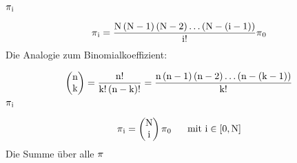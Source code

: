 {\begin{uebsp}
\begin{Answer}
$\normalsubformula{\text{$\pi
$}}_{\normalsubformula{\text{i}}}\normalsubformula{\text{~}}$

\begin{equation*}
\normalsubformula{\text{$\pi
$}}_{\normalsubformula{\text{i}}}=\frac{\normalsubformula{\text{N}}\left(\normalsubformula{\text{N}}-\normalsubformula{\text{1}}\right)\left(\normalsubformula{\text{N}}-\normalsubformula{\text{2}}\right)\ldots
\left(\normalsubformula{\text{N}}-\left(\normalsubformula{\text{i}}-\normalsubformula{\text{1}}\right)\right)}{\normalsubformula{\text{i}}!}\normalsubformula{\text{$\pi
$}}_{\normalsubformula{\text{0}}}
\end{equation*}
{
Die Analogie zum Binomialkoeffizient:}

\begin{equation*}
\left(\begin{matrix}\normalsubformula{\text{n}}\\\normalsubformula{\text{k}}\end{matrix}\right)=\frac{\normalsubformula{\text{n}}!}{\normalsubformula{\text{k}}!\left(\normalsubformula{\text{n}}-\normalsubformula{\text{k}}\right)!}=\frac{\normalsubformula{\text{n}}\left(\normalsubformula{\text{n}}-\normalsubformula{\text{1}}\right)\left(\normalsubformula{\text{n}}-\normalsubformula{\text{2}}\right)\ldots
\left(\normalsubformula{\text{n}}-\left(\normalsubformula{\text{k}}-\normalsubformula{\text{1}}\right)\right)}{\normalsubformula{\text{k}}!}
\end{equation*}
 $\normalsubformula{\text{$\pi
$}}_{\normalsubformula{\text{i}}}\normalsubformula{\text{~}}$

\begin{equation*}
\normalsubformula{\text{$\pi
$}}_{\normalsubformula{\text{i}}}=\left(\begin{matrix}\normalsubformula{\text{N}}\\\normalsubformula{\text{i}}\end{matrix}\right)\normalsubformula{\text{$\pi
$}}_{\normalsubformula{\text{0}}}\normalsubformula{\text{~}}\normalsubformula{\text{~}}\normalsubformula{\text{~}}\normalsubformula{\text{~}}\normalsubformula{\text{~}}\normalsubformula{\text{m}}\normalsubformula{\text{i}}\normalsubformula{\text{t}}\normalsubformula{\text{~}}\normalsubformula{\text{i}}\in
[\normalsubformula{\text{0}},\normalsubformula{\text{N}}]
\end{equation*}
Die Summe \"uber alle  $\normalsubformula{\text{$\pi
$}}\normalsubformula{\text{~}}$


\end{Answer}
\end{uebsp}}
